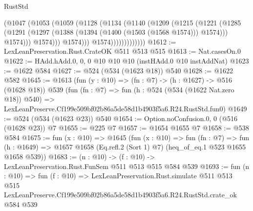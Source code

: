 \begin{lexlean}{RustStd}
\begin{coremodule}
                          (@1047
                            (@1053
                              (@1059
                                (@1128
                                  (@1134
                                    (@1140
                                      (@1209
                                        (@1215
                                          (@1221
                                            (@1285
                                              (@1291
                                                (@1297
                                                  (@1388
                                                    (@1394 (@1400 (@1503 (@1568 @1574))) @1574)))
                                                @1574)))
                                          @1574)))
                                    @1574)))
                              @1574)))))))))))))
@1612 := LexLeanPreservation.Rust.CrateOK @511 @513 @515
@1613 := Nat.casesOn.{0}
@1622 := HAdd.hAdd.{0, 0, 0} @10 @10 @10 (instHAdd.{0} @10 instAddNat)
@1623 := @1622 @584
@1627 := @524 (@534 (@1623 @18)) @540
@1628 := @1622 @582
@1645 := @1613
    (fun (y : @10) => (fn : @7) -> (h : @1627) -> @516 (@1628 @18))
    @539
    (fun (fn : @7) =>
    fun (h : @524 (@534 (@1622 Nat.zero @18)) @540) =>
    LexLeanPreserve.Cf199e509bf02b86a5de58d1b4903f5a6.R24.RustStd.fun0)
@1649 := @524 (@534 (@1623 @23)) @540
@1654 := Option.noConfusion.{0, 0} (@516 (@1628 @23)) @7
@1655 := @225 @7
@1657 := @1654 @1655 @7
@1658 := @538 @584
@1675 := fun (x : @10) =>
  @1645
    (fun (x : @10) =>
    fun (fn : @7) =>
    fun (h : @1649) => @1657 @1658 (Eq.refl.{2} (Sort 1) @7) (heq_of_eq.{1} @523 @1655 @1658 @539))
@1683 := (n : @10) -> (f : @10) -> LexLeanPreservation.Rust.FunSem @511 @513 @515 @584 @539
@1693 := fun (n : @10) =>
  fun (f : @10) =>
  LexLeanPreservation.Rust.simulate
    @511
    @513
    @515
    LexLeanPreserve.Cf199e509bf02b86a5de58d1b4903f5a6.R24.RustStd.crate_ok
    @584
    @539
\end{coremodule}
\end{lexlean}
